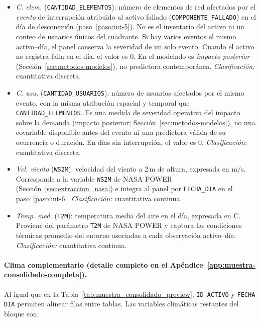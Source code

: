     \begin{itemize}
        \item \textit{C. elem.} (\texttt{CANTIDAD\_ELEMENTOS}): número de elementos de red afectados por el \textit{evento} de interrupción atribuido al activo fallado (\texttt{COMPONENTE\_FALLADO}) en el día de desconexión (paso~\ref{paso:int-5}). No es el inventario del activo ni un conteo de usuarios únicos del cuadrante. Si hay varios eventos el mismo activo--día, el panel conserva la severidad de un solo evento. Cuando el activo no registra falla en el día, el valor es 0. En el modelado es \textit{impacto posterior} (Sección~\ref{sec:metodos-modelos}), no predictora contemporánea. \textit{Clasificación:} cuantitativa discreta.
    
        \item \textit{C. usu.} (\texttt{CANTIDAD\_USUARIOS}): número de usuarios afectados por el mismo evento, con la misma atribución espacial y temporal que \texttt{CANTIDAD\_ELEMENTOS}. Es una medida de severidad operativa del impacto sobre la demanda (impacto posterior; Sección~\ref{sec:metodos-modelos}), no una covariable disponible antes del evento ni una predictora válida de su ocurrencia o duración. En días sin interrupción, el valor es 0. \textit{Clasificación:} cuantitativa discreta.
    
        \item \textit{Vel. viento} (\texttt{WS2M}): velocidad del viento a 2\,m de altura, expresada en m/s. Corresponde a la variable \texttt{WS2M} de NASA POWER (Sección~\ref{sec:extraccion_nasa}) e integra al panel por \texttt{FECHA\_DIA} en el paso~\ref{paso:int-6}. \textit{Clasificación:} cuantitativa continua.
    
        \item \textit{Temp. med.} (\texttt{T2M}): temperatura media del aire en el día, expresada en \textdegree C. Proviene del parámetro \texttt{T2M} de NASA POWER y captura las condiciones térmicas promedio del entorno asociadas a cada observación activo--día. \textit{Clasificación:} cuantitativa continua.
    \end{itemize}
    
        \paragraph{Clima complementario (detalle completo en el Apéndice~\ref{app:muestra-consolidado-completa}).}
        Al igual que en la Tabla~\ref{tab:muestra_consolidado_preview}, \texttt{ID ACTIVO} y \texttt{FECHA DIA} permiten alinear filas entre tablas. Las variables climáticas restantes del bloque son:
        
